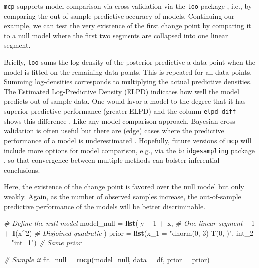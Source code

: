 \documentclass[
  american,
]{article}
\newenvironment{Shaded}{\begin{snugshade}}{\end{snugshade}}
\newcommand{\CommentTok}[1]{\textcolor[rgb]{0.56,0.35,0.01}{\textit{#1}}}
\newcommand{\DataTypeTok}[1]{\textcolor[rgb]{0.13,0.29,0.53}{#1}}
\newcommand{\DecValTok}[1]{\textcolor[rgb]{0.00,0.00,0.81}{#1}}
\newcommand{\KeywordTok}[1]{\textcolor[rgb]{0.13,0.29,0.53}{\textbf{#1}}}
\newcommand{\NormalTok}[1]{#1}
\newcommand{\OperatorTok}[1]{\textcolor[rgb]{0.81,0.36,0.00}{\textbf{#1}}}
\newcommand{\StringTok}[1]{\textcolor[rgb]{0.31,0.60,0.02}{#1}}
\begin{document}
\texttt{mcp} supports model comparison via cross-validation via the \texttt{loo} package \citep{vehtari2017}, i.e., by comparing the out-of-sample predictive accuracy of models. Continuing our example, we can test the very existence of the first change point by comparing it to a null model where the first two segments are collapsed into one linear segment.

Briefly, \texttt{loo} sums the log-density of the posterior predictive a data point when the model is fitted on the remaining data points. This is repeated for all data points. Summing log-densities corresponds to multiplying the actual predictive densities. The Estimated Log-Predictive Density (ELPD) indicates how well the model predicts out-of-sample data. One would favor a model to the degree that it has superior predictive performance (greater ELPD) and the column \texttt{elpd\_diff} shows this difference \citep{vehtari2017, gelman2013b}. Like any model comparison approach, Bayesian cross-validation is often useful but there are (edge) cases where the predictive performance of a model is underestimated \citep{gronau2019a}. Hopefully, future versions of \texttt{mcp} will include more options for model comparison, e.g., via the \texttt{bridgesampling} package \citep{gronau2018}, so that convergence between multiple methods can bolster inferential conclusions.

Here, the existence of the change point is favored over the null model but only weakly. Again, as the number of observed samples increase, the out-of-sample predictive performance of the models will be better discriminable.

\begin{Shaded}
\begin{Highlighting}[]
\CommentTok{# Define the null model}
\NormalTok{model_null =}\StringTok{ }\KeywordTok{list}\NormalTok{(}
\NormalTok{  y }\OperatorTok{~}\StringTok{ }\DecValTok{1} \OperatorTok{+}\StringTok{ }\NormalTok{x,      }\CommentTok{# One linear segment}
    \OperatorTok{~}\StringTok{ }\DecValTok{1} \OperatorTok{+}\StringTok{ }\KeywordTok{I}\NormalTok{(x}\OperatorTok{^}\DecValTok{2}\NormalTok{)  }\CommentTok{# Disjoined quadratic}
\NormalTok{)}
\NormalTok{prior =}\StringTok{ }\KeywordTok{list}\NormalTok{(}\DataTypeTok{x_1 =} \StringTok{"dnorm(0, 3) T(0, )"}\NormalTok{, }\DataTypeTok{int_2 =} \StringTok{"int_1"}\NormalTok{)  }\CommentTok{# Same prior}

\CommentTok{# Sample it}
\NormalTok{fit_null =}\StringTok{ }\KeywordTok{mcp}\NormalTok{(model_null, }\DataTypeTok{data =}\NormalTok{ df, }\DataTypeTok{prior =}\NormalTok{ prior)}
\end{Highlighting}
\end{Shaded}
\end{document}
